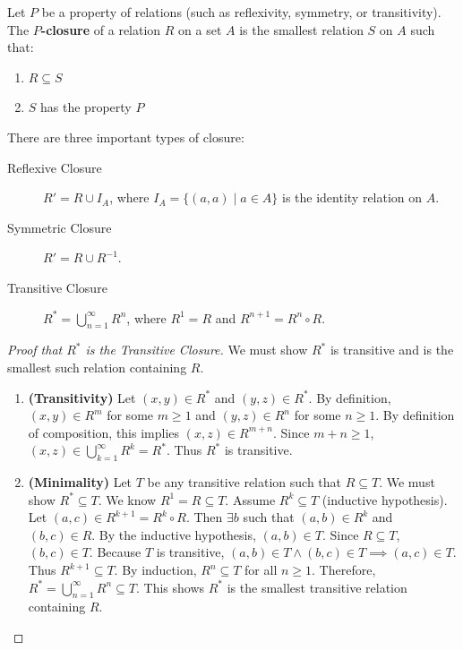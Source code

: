 \documentclass[oneside]{book}
\begin{document}
\begin{definition}[Closure]
Let $P$ be a property of relations (such as reflexivity, symmetry, or transitivity). The \textbf{$P$-closure} of a relation $R$ on a set $A$ is the smallest relation $S$ on $A$ such that:
\begin{enumerate}
    \item $R \subseteq S$
    \item $S$ has the property $P$
\end{enumerate}
\end{definition}

There are three important types of closure:
\begin{description}
    \item[Reflexive Closure] $R' = R \cup I_A$, where $I_A = \{(a,a) \mid a \in A\}$ is the identity relation on $A$.
    \item[Symmetric Closure] $R' = R \cup R^{-1}$.
    \item[Transitive Closure] $R^* = \bigcup_{n=1}^\infty R^n$, where $R^1=R$ and $R^{n+1} = R^n \circ R$.
\end{description}

\begin{proof}[Proof that $R^*$ is the Transitive Closure]
We must show $R^*$ is transitive and is the smallest such relation containing $R$.
\begin{enumerate}
    \item \textbf{(Transitivity)}
    Let $(x,y) \in R^*$ and $(y,z) \in R^*$. By definition, $(x,y) \in R^m$ for some $m \ge 1$ and $(y,z) \in R^n$ for some $n \ge 1$.
    By definition of composition, this implies $(x,z) \in R^{m+n}$.
    Since $m+n \ge 1$, $(x,z) \in \bigcup_{k=1}^\infty R^k = R^*$.
    Thus $R^*$ is transitive.
    
    \item \textbf{(Minimality)}
    Let $T$ be any transitive relation such that $R \subseteq T$. We must show $R^* \subseteq T$.
    We know $R^1 = R \subseteq T$.
    Assume $R^k \subseteq T$ (inductive hypothesis).
    Let $(a,c) \in R^{k+1} = R^k \circ R$. Then $\exists b$ such that $(a,b) \in R^k$ and $(b,c) \in R$.
    By the inductive hypothesis, $(a,b) \in T$. Since $R \subseteq T$, $(b,c) \in T$.
    Because $T$ is transitive, $(a,b) \in T \wedge (b,c) \in T \implies (a,c) \in T$.
    Thus $R^{k+1} \subseteq T$.
    By induction, $R^n \subseteq T$ for all $n \ge 1$.
    Therefore, $R^* = \bigcup_{n=1}^\infty R^n \subseteq T$.
    This shows $R^*$ is the smallest transitive relation containing $R$.
\end{enumerate}
\end{proof}
\end{document}
